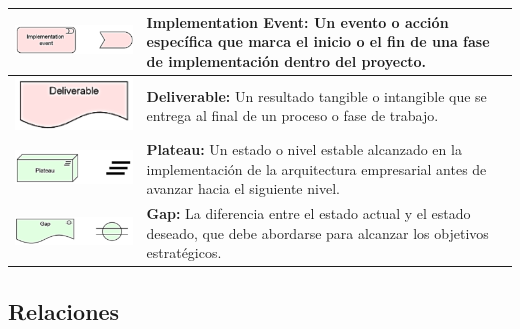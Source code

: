 \begin{longtable}{|c|p{8cm}|}
\hline
\includegraphics{anexos/ARCHI/strategy/event.png} & 
\textbf{Implementation Event:} Un evento o acción específica que marca el inicio o el fin de una fase de implementación dentro del proyecto. \\
\hline
\includegraphics{anexos/ARCHI/strategy/deliverable.png} & 
\textbf{Deliverable:} Un resultado tangible o intangible que se entrega al final de un proceso o fase de trabajo. \\
\hline
\includegraphics{anexos/ARCHI/strategy/plateau.png} & 
\textbf{Plateau:} Un estado o nivel estable alcanzado en la implementación de la arquitectura empresarial antes de avanzar hacia el siguiente nivel. \\
\hline
\includegraphics{anexos/ARCHI/strategy/gap.png} & 
\textbf{Gap:} La diferencia entre el estado actual y el estado deseado, que debe abordarse para alcanzar los objetivos estratégicos. \\
\hline
\end{longtable}

\subsection{Relaciones}

